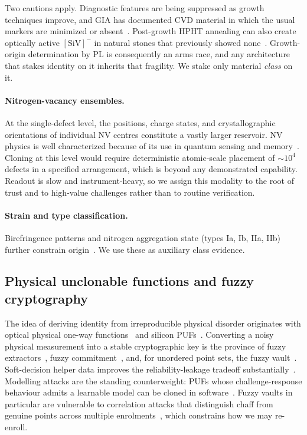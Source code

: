 \documentclass[10pt,twocolumn]{article}
\theoremstyle{remark}
\begin{document}
Two cautions apply. Diagnostic features are being suppressed as growth
techniques improve, and GIA has documented CVD material in which the usual
markers are minimized or absent~\cite{gia_cvd2023}. Post-growth HPHT annealing
can also create optically active $[\mathrm{SiV}]^{-}$ in natural stones that
previously showed none~\cite{gia_pl2024}. Growth-origin determination by PL is
consequently an arms race, and any architecture that stakes identity on it
inherits that fragility. We stake only material \emph{class} on it.

\paragraph{Nitrogen-vacancy ensembles.} At the single-defect level, the
positions, charge states, and crystallographic orientations of individual NV
centres constitute a vastly larger reservoir. NV physics is
well characterized because of its use in quantum sensing and
memory~\cite{doherty2013,balasubramanian2008,maurer2012}. Cloning at this level
would require deterministic atomic-scale placement of $\sim 10^{4}$ defects in a
specified arrangement, which is beyond any demonstrated capability. Readout is
slow and instrument-heavy, so we assign this modality to the root of trust and
to high-value challenges rather than to routine verification.

\paragraph{Strain and type classification.} Birefringence patterns and nitrogen
aggregation state (types Ia, Ib, IIa, IIb) further constrain
origin~\cite{breeding2009}. We use these as auxiliary class evidence.

\subsection{Physical unclonable functions and fuzzy cryptography}

The idea of deriving identity from irreproducible physical disorder originates
with optical physical one-way functions~\cite{pappu2002} and silicon
PUFs~\cite{gassend2002,suh2007}. Converting a noisy physical measurement into a
stable cryptographic key is the province of fuzzy
extractors~\cite{dodis2008}, fuzzy commitment~\cite{juels1999}, and, for
unordered point sets, the fuzzy vault~\cite{juels2006}. Soft-decision helper
data improves the reliability-leakage tradeoff substantially~\cite{maes2009}.
Modelling attacks are the standing counterweight: PUFs whose challenge-response
behaviour admits a learnable model can be cloned in
software~\cite{ruhrmair2010}. Fuzzy vaults in particular are vulnerable to
correlation attacks that distinguish chaff from genuine points across multiple
enrolments~\cite{scheirer2007}, which constrains how we may re-enroll.
\end{document}
